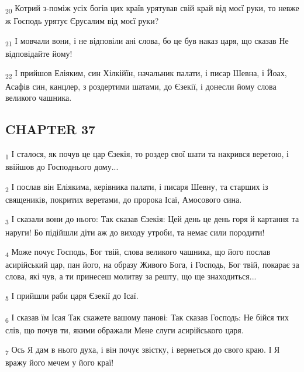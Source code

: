 \begin{tcolorbox}
\textsubscript{20} Котрий з-поміж усіх богів цих країв урятував свій край від моєї руки, то невже ж Господь урятує Єрусалим від моєї руки?
\end{tcolorbox}
\begin{tcolorbox}
\textsubscript{21} І мовчали вони, і не відповіли ані слова, бо це був наказ царя, що сказав Не відповідайте йому!
\end{tcolorbox}
\begin{tcolorbox}
\textsubscript{22} І прийшов Еліяким, син Хілкійїн, начальник палати, і писар Шевна, і Йоах, Асафів син, канцлер, з роздертими шатами, до Єзекії, і донесли йому слова великого чашника.
\end{tcolorbox}
\subsection{CHAPTER 37}
\begin{tcolorbox}
\textsubscript{1} І сталося, як почув це цар Єзекія, то роздер свої шати та накрився веретою, і ввійшов до Господнього дому...
\end{tcolorbox}
\begin{tcolorbox}
\textsubscript{2} І послав він Еліякима, керівника палати, і писаря Шевну, та старших із священиків, покритих веретами, до пророка Ісаї, Амосового сина.
\end{tcolorbox}
\begin{tcolorbox}
\textsubscript{3} І сказали вони до нього: Так сказав Єзекія: Цей день це день горя й картання та наруги! Бо підійшли діти аж до виходу утроби, та немає сили породити!
\end{tcolorbox}
\begin{tcolorbox}
\textsubscript{4} Може почує Господь, Бог твій, слова великого чашника, що його послав асирійський цар, пан його, на образу Живого Бога, і Господь, Бог твій, покарає за слова, які чув, а ти принесеш молитву за решту, що ще знаходиться...
\end{tcolorbox}
\begin{tcolorbox}
\textsubscript{5} І прийшли раби царя Єзекії до Ісаї.
\end{tcolorbox}
\begin{tcolorbox}
\textsubscript{6} І сказав їм Ісая Так скажете вашому панові: Так сказав Господь: Не бійся тих слів, що почув ти, якими ображали Мене слуги асирійського царя.
\end{tcolorbox}
\begin{tcolorbox}
\textsubscript{7} Ось Я дам в нього духа, і він почує звістку, і вернеться до свого краю. І Я вражу його мечем у його краї!
\end{tcolorbox}
